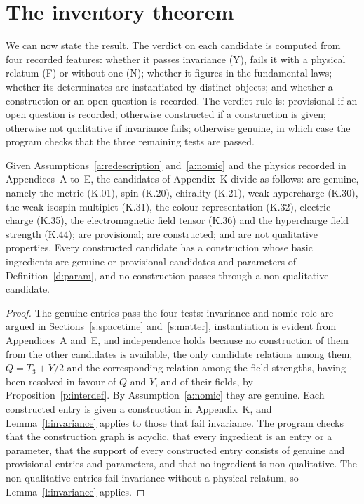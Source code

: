 \documentclass{situationist-preprint}
\begin{document}
\section{The inventory theorem}\label{s:theorem}

We can now state the result. The verdict on each candidate is computed from four recorded features: whether it passes invariance (Y), fails it with a physical relatum (F) or without one (N); whether it figures in the fundamental laws; whether its determinates are instantiated by distinct objects; and whether a construction or an open question is recorded. The verdict rule is: provisional if an open question is recorded; otherwise constructed if a construction is given; otherwise not qualitative if invariance fails; otherwise genuine, in which case the program checks that the three remaining tests are passed.

\begin{theorem}[Inventory]\label{t:inventory}
Given Assumptions~\ref{a:redescription} and~\ref{a:nomic} and the physics recorded in Appendices~A to~E, the \vvNK{} candidates of Appendix~K divide as follows: \vvNKgenuine{} are genuine, namely the metric (K.01), spin (K.20), chirality (K.21), weak hypercharge (K.30), the weak isospin multiplet (K.31), the colour representation (K.32), electric charge (K.35), the electromagnetic field tensor (K.36) and the hypercharge field strength (K.44); \vvNKprovisional{} are provisional; \vvNKconstructed{} are constructed; and \vvNKnonqual{} are not qualitative properties. Every constructed candidate has a construction whose basic ingredients are genuine or provisional candidates and parameters of Definition~\ref{d:param}, and no construction passes through a non-qualitative candidate.
\end{theorem}

\begin{proof}
The genuine entries pass the four tests: invariance and nomic role are argued in Sections~\ref{s:spacetime} and~\ref{s:matter}, instantiation is evident from Appendices~A and~E, and independence holds because no construction of them from the other candidates is available, the only candidate relations among them, $Q = T_3 + Y/2$ and the corresponding relation among the field strengths, having been resolved in favour of $Q$ and $Y$, and of their fields, by Proposition~\ref{p:interdef}. By Assumption~\ref{a:nomic} they are genuine. Each constructed entry is given a construction in Appendix~K, and Lemma~\ref{l:invariance} applies to those that fail invariance. The program checks that the construction graph is acyclic, that every ingredient is an entry or a parameter, that the support of every constructed entry consists of genuine and provisional entries and parameters, and that no ingredient is non-qualitative. The non-qualitative entries fail invariance without a physical relatum, so Lemma~\ref{l:invariance} applies.
\end{proof}
\end{document}
